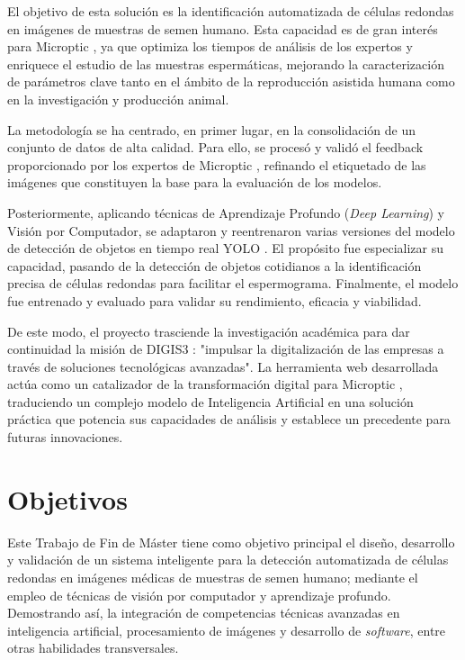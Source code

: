 \documentclass[12pt,a4paper,onecolumn,oneside]{report}
\begin{document}
El objetivo de esta solución es la identificación automatizada de células redondas en imágenes de muestras de semen humano. Esta capacidad es de 
gran interés para Microptic \cite{microptic}, ya que optimiza los tiempos de análisis de los expertos y enriquece el estudio de las muestras espermáticas, 
mejorando la caracterización de parámetros clave tanto en el ámbito de la reproducción asistida humana como en la investigación y producción animal. 

La metodología se ha centrado, en primer lugar, en la consolidación de un conjunto de datos de alta calidad. Para ello, se procesó y validó el feedback 
proporcionado por los expertos de Microptic \cite{microptic}, refinando el etiquetado de las imágenes que constituyen la base para la evaluación de los modelos.

Posteriormente, aplicando técnicas de Aprendizaje Profundo (\textit{Deep Learning}) y Visión por Computador, se adaptaron y reentrenaron varias versiones 
del modelo de detección de objetos en tiempo real YOLO \cite{ultralytics_models}. El propósito fue especializar su capacidad, pasando de la detección de objetos 
cotidianos a la identificación precisa de células redondas para facilitar el espermograma. Finalmente, el modelo fue entrenado y evaluado 
para validar su rendimiento, eficacia y viabilidad.

De este modo, el proyecto trasciende la investigación académica para dar continuidad la misión de DIGIS3 \cite{digis3}: "impulsar la digitalización de las empresas a través 
de soluciones tecnológicas avanzadas". La herramienta web desarrollada actúa como un catalizador de la transformación digital para Microptic \cite{microptic}, traduciendo 
un complejo modelo de Inteligencia Artificial en una solución práctica que potencia sus capacidades de análisis y establece un precedente para futuras innovaciones.

\section{Objetivos}
\label{sec:Objetivos}

Este Trabajo de Fin de Máster tiene como objetivo principal el diseño, desarrollo y validación de un sistema inteligente para la detección automatizada de células redondas en imágenes médicas de muestras de semen humano;
mediante el empleo de técnicas de visión por computador y aprendizaje profundo. 
Demostrando así, la integración de competencias técnicas avanzadas en inteligencia artificial, procesamiento de imágenes y desarrollo de \textit{software}, entre otras habilidades transversales. 
\end{document}
